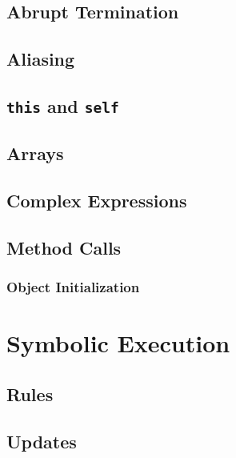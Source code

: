 \documentclass[a4paper, 11pt, accentcolor = tud3b]{tudreport}
\begin{document}
			\subsection{Abrupt Termination} %

			\subsection{Aliasing} %

			\subsection{\texttt{this} and \texttt{self}} %

			\subsection{Arrays} %

			\subsection{Complex Expressions} %

			\subsection{Method Calls} %

				\subsubsection{Object Initialization} %

		\section{Symbolic Execution} %

			\subsection{Rules} %

			\subsection{Updates} %
\end{document}
